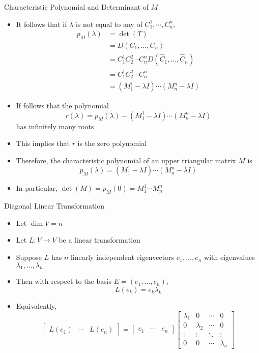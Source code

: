 \documentclass[usenames,dvipsnames,10pt]{beamer}
\begin{document}
\begin{frame}
  {Characteristic Polynomial and Determinant of $M$}
  \begin{itemize}
  \item It follows that if $\lambda$ is not equal to any of $C^1_1, \cdots, C^n_n$,
    \begin{align*}
      p_M(\lambda)  &=\det(T)\\
                    &= D(C_1, \dots, C_n)\\
                    &= C^1_1C^2_2\cdots C^n_nD(\hat{C}_1, \dots,\hat{C}_n)\\
                    &= C^1_1C^2_2\cdots C^n_n\\
                    &= (M^1_1-\lambda I)\cdots(M^n_n-\lambda I)
    \end{align*}
  \item If follows that the polynomial
    \[
      r(\lambda) = p_M(\lambda)-(M^1_1-\lambda I)\cdots(M^n_n-\lambda I)
    \]
    has infinitely many roots
  \item This implies that $r$ is the zero polynomial
  \item Therefore, the characteristic polynomial of an upper triangular matrix $M$ is
    \[ p_M(\lambda) = (M^1_1-\lambda I)\cdots(M^n_n-\lambda I) \]
  \item In particular, $\det(M)=p_M(0)=M^1_1\cdots M^n_n$
  \end{itemize}
\end{frame}

\begin{frame}
  {Diagonal Linear Transformation}

  \begin{itemize}
  \item Let $\dim V = n$
  \item Let $L: V \rightarrow V$ be a linear transformation
  \item Suppose $L$ has $n$ linearly independent eigenvectors $e_1, \dots, e_n$ with eigenvalues $\lambda_1, \dots,\lambda_n$
  \item Then with respect to the basis $E = (e_1, \dots, e_n)$,
    \[
      L(e_k) = e_k\lambda_k
    \]
  \item Equivalently,
    \[ \begin{bmatrix} L(e_1) & \cdots & L(e_n) \end{bmatrix}
      = \begin{bmatrix} e_1 & \cdots & e_n \end{bmatrix}\begin{bmatrix} \lambda_1 & 0 &\cdots & 0 \\ 0 & \lambda_2 & \cdots & 0 \\ \vdots & \vdots & \ddots & \vdots \\ 0 & 0 & \cdots & \lambda_n \end{bmatrix}
    \]
  \end{itemize}
\end{frame}
\end{document}
